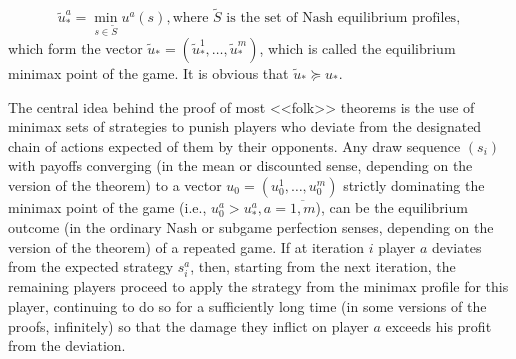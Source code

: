 \begin{equation*}
	\tilde{u}^a_* = \min_{s \in \tilde{S}} u^a(s), \text{where $\tilde{S}$ is the set of Nash equilibrium profiles},
\end{equation*}
which form the vector $\tilde{u}_* = (\tilde{u}^1_*, \ldots, \tilde{u}^m_*)$, which is called the equilibrium minimax point of the game. It is obvious that $\tilde{u}_* \succeq u_*$. %

The central idea behind the proof of most <<folk>> theorems is the use of minimax sets of strategies to punish players who deviate from the designated chain of actions expected of them by their opponents. Any draw sequence $(s_i)$ with payoffs converging (in the mean or discounted sense, depending on the version of the theorem) to a vector $u_0 = (u^1_0, \ldots, u^m_0)$ strictly dominating the minimax point of the game (i.e., $u^a_0 > u^a_*, a = \overline{1,m}$), can be the equilibrium outcome (in the ordinary Nash or subgame perfection senses, depending on the version of the theorem) of a repeated game. If at iteration $i$ player $a$ deviates from the expected strategy $s^a_i$, then, starting from the next iteration, the remaining players proceed to apply the strategy from the minimax profile for this player, continuing to do so for a sufficiently long time (in some versions of the proofs, infinitely) so that the damage they inflict on player $a$ exceeds his profit from the deviation. %

